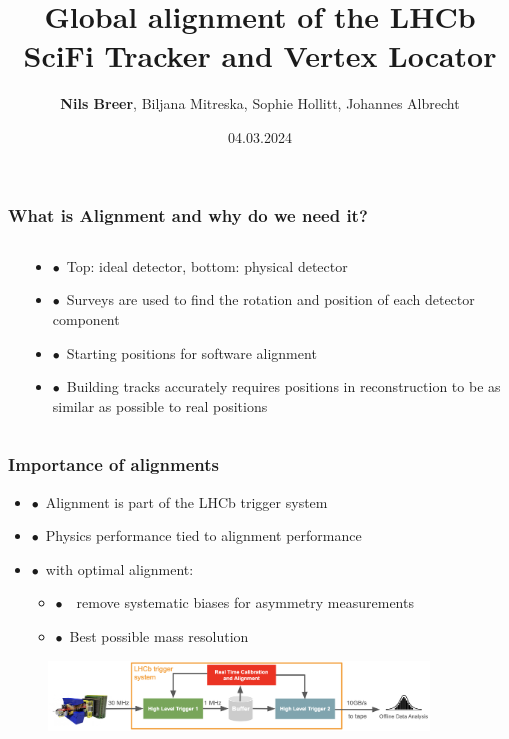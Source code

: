 \documentclass[aspectratio=1610, 12pt, xcolor=dvipsnames]{beamer}
\title{Global alignment of the LHCb SciFi Tracker and Vertex Locator}
\author[N.Breer]{\textbf{Nils Breer}, Biljana Mitreska, Sophie Hollitt, Johannes Albrecht}
\institute{DPG Conference, Karlsruhe}
\date{04.03.2024}
\begin{document}
\maketitle

\begin{frame}\frametitle{What is Alignment and why do we need it?}
  \begin{columns}
    \begin{column}[c]{0.48\textwidth}
      
    \end{column}
    \begin{column}[c]{0.48\textwidth}
      \begin{itemize}
        \item $\bullet$\, Top: ideal detector, bottom: physical detector
        \item $\bullet$\, Surveys are used to find the rotation and position of each detector component
        \item $\bullet$\, \to Starting positions for software alignment
        \item $\bullet$\, Building tracks accurately requires positions in reconstruction to be as similar as possible to real positions
      \end{itemize}
    \end{column}
  \end{columns}
\end{frame}

\begin{frame}\frametitle{Importance of alignments}
  \begin{itemize}
    \item $\bullet$\, Alignment is part of the LHCb trigger system
    \item $\bullet$\, Physics performance tied to alignment performance
    \item $\bullet$\, with optimal alignment:
    \begin{itemize}
      \item $\bullet$\, \to\, remove systematic biases for asymmetry measurements
      \item $\bullet$\, Best possible mass resolution
    \end{itemize}
  \end{itemize}
  \begin{figure}
      \includegraphics[width=0.9\textwidth]{logos/dataflow.png}%
  \end{figure}
\end{frame}
\end{document}
